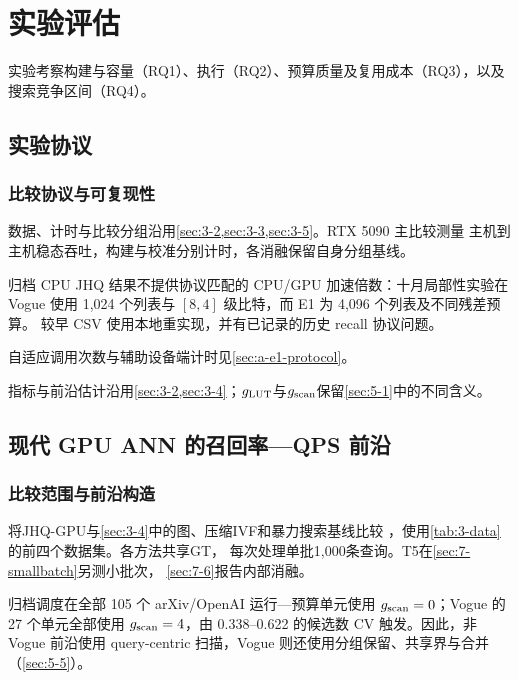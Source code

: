 \chapter{实验评估}
\label{ch:evaluation}

实验考察构建与容量（RQ1）、执行（RQ2）、预算质量及复用成本（RQ3），以及搜索竞争区间（RQ4）。

\section{实验协议}
\label{sec:7-1}

\subsection{比较协议与可复现性}

数据、计时与比较分组沿用\cref{sec:3-2,sec:3-3,sec:3-5}。RTX 5090 主比较测量
主机到主机稳态吞吐，构建与校准分别计时，各消融保留自身分组基线。


归档 CPU JHQ 结果不提供协议匹配的 CPU/GPU 加速倍数：十月局部性实验在 Vogue
使用 1,024 个列表与 $[8,4]$ 级比特，而 E1 为 4,096 个列表及不同残差预算。
较早 CSV 使用本地重实现，并有已记录的历史 recall 协议问题。

自适应调用次数与辅助设备端计时见\cref{sec:a-e1-protocol}。

指标与前沿估计沿用\cref{sec:3-2,sec:3-4}；$g_{\mathrm{LUT}}$与$g_{\mathrm{scan}}$保留\cref{sec:5-1}中的不同含义。





\section{现代 GPU ANN 的召回率—QPS 前沿}
\label{sec:7-2}


\subsection{比较范围与前沿构造}

将JHQ-GPU与\cref{sec:3-4}中的图、压缩IVF和暴力搜索基线比较
\cite{cagra,pq,ivfrabitq}，使用\cref{tab:3-data}的前四个数据集。各方法共享GT，
每次处理单批1,000条查询。T5在\cref{sec:7-smallbatch}另测小批次，
\cref{sec:7-6}报告内部消融。


归档调度在全部 105 个 arXiv/OpenAI 运行—预算单元使用 $g_{\mathrm{scan}}=0$；Vogue 的 27 个单元全部使用 $g_{\mathrm{scan}}=4$，由 0.338--0.622 的候选数 CV 触发。因此，非 Vogue 前沿使用 query-centric 扫描，Vogue 则还使用分组保留、共享界与合并（\cref{sec:5-5}）。

